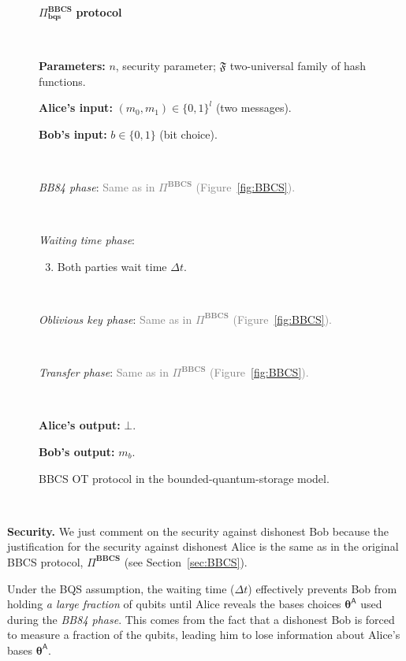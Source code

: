 \begin{figure}[h!]
\centering
\begin{tcolorbox}
    
    \centerline{$\Pi^{\textbf{BBCS}}_{\textbf{bqs}}$ \textbf{protocol}}
            
    \
    
    \textbf{Parameters:} $n$, security parameter; $\mathfrak{F}$  two-universal family of hash functions.
    
    \textbf{Alice's input:} $(m_0, m_1)\in\{0,1\}^l$ (two messages). 
    
    \textbf{Bob's input:} $b\in\{0,1\}$ (bit choice).
    
    \
    
    \textit{BB84 phase}: \textcolor{gray}{Same as in $\Pi^{\textbf{BBCS}}$ (Figure~\ref{fig:BBCS}).}
    
    
    \
    
    \textit{Waiting time phase}:
    \begin{enumerate}
    \setcounter{enumi}{2}
        \item Both parties wait time $\Delta t$.
    \end{enumerate}
    
    \
    
    \textit{Oblivious key phase}: \textcolor{gray}{Same as in $\Pi^{\textbf{BBCS}}$ (Figure~\ref{fig:BBCS}).}
     
    \
     
    \textit{Transfer phase}: \textcolor{gray}{Same as in $\Pi^{\textbf{BBCS}}$ (Figure~\ref{fig:BBCS}).}
    
    \
    
\textbf{Alice's output:} $\bot$.

\textbf{Bob's output:} $m_b$.
    
\end{tcolorbox}
    \caption{BBCS OT protocol in the bounded-quantum-storage model.}
    \label{fig:BBCS_Bounded}
\end{figure}

\

\noindent\textbf{Security.} We just comment on the security against dishonest Bob because the justification for the security against dishonest Alice is the same as in the original BBCS protocol, $\Pi^{\textbf{BBCS}}$ (see Section~\ref{sec:BBCS}). 

Under the BQS assumption, the waiting time ($\Delta t$) effectively prevents Bob from holding \textit{a large fraction} of qubits until Alice reveals the bases choices $\bm{\theta}^{\mathsf{A}}$ used during the \textit{BB84 phase}. This comes from the fact that a dishonest Bob is forced to measure a fraction of the qubits, leading him to lose information about Alice's bases $\bm{\theta}^{\mathsf{A}}$.

